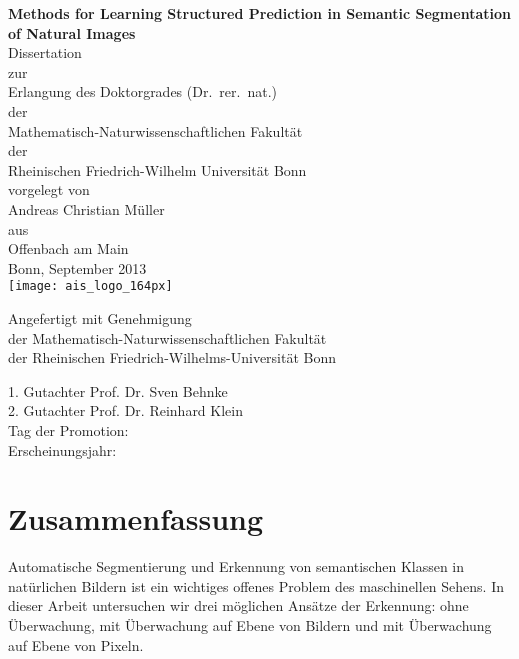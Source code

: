 \documentclass[12pt,toc=bibnumbered, a4paper,twoside,DIV=11,BCOR=1cm]{scrbook}
\begin{document}
%
\begin{spacing}{1.6}
\begin{titlepage}
\vspace*{1mm}
\begin{center}
\Large\sffamily
\textbf{{\huge Methods for Learning Structured Prediction in Semantic Segmentation of Natural Images}}\\[4mm]
Dissertation\\
zur\\
Erlangung des Doktorgrades (Dr.\ rer.\ nat.)\\
der\\
Mathematisch-Naturwissenschaftlichen Fakult\"at\\
der\\
Rheinischen Friedrich-Wilhelm Universit\"at Bonn\\
vorgelegt von\\
{\LARGE Andreas Christian M\"uller}\\
aus\\
Offenbach am Main\\
Bonn, September 2013\\[5mm]

\texttt{[image: ais\_logo\_164px]}
\end{center}
\end{titlepage}
%
\clearpage
{}
\setcounter{page}{2}
\vspace*{5cm}
\Large\sffamily
\begin{center}
Angefertigt mit Genehmigung\\
der Mathematisch-Naturwissenschaftlichen Fakult\"at\\
der Rheinischen Friedrich-Wilhelms-Universit\"at Bonn\\
\end{center}
1. Gutachter Prof. Dr. Sven Behnke\\
2. Gutachter Prof. Dr. Reinhard Klein\\
Tag der Promotion:\\
Erscheinungsjahr:\\
\end{spacing}
\tableofcontents
\chapter*{Zusammenfassung}
\enlargethispage{10mm}
Automatische Segmentierung und Erkennung von semantischen Klassen in
nat\"urlichen Bildern ist ein wichtiges offenes Problem des maschinellen Sehens.
In dieser Arbeit untersuchen wir drei m\"oglichen Ans\"atze der Erkennung:
ohne \"Uberwachung, mit \"Uberwachung auf Ebene von Bildern und mit \"Uberwachung auf Ebene
von Pixeln.
\end{document}
